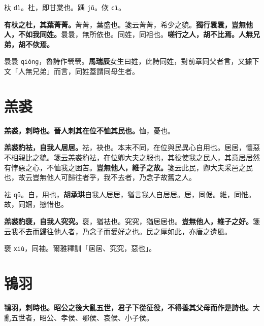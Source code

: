 \begin{quoting}杕 \texttt{dì}。杜，即甘棠也。踽 \texttt{jǔ}。佽 \texttt{cì}。\end{quoting}

\textbf{有杕之杜，其葉菁菁。}{\footnotesize 菁菁，葉盛也。箋云菁菁，希少之貌。}\textbf{獨行睘睘，豈無他人，不如我同姓。}{\footnotesize 睘睘，無所依也。同姓，同祖也。}\textbf{嗟行之人，胡不比焉。人無兄弟，胡不佽焉。}

\begin{quoting}睘睘 \texttt{qióng}，魯詩作煢煢。\textbf{馬瑞辰}女生曰姓，此詩同姓，對前章同父者言，又據下文「人無兄弟」而言，同姓蓋謂同母生者。\end{quoting}

\section{羔裘}


\textbf{羔裘，刺時也。晉人刺其在位不恤其民也。}{\footnotesize 恤，憂也。}

\textbf{羔裘豹袪，自我人居居。}{\footnotesize 袪，袂也。本末不同，在位與民異心自用也。居居，懷惡不相親比之貌。箋云羔裘豹袪，在位卿大夫之服也，其役使我之民人，其意居居然有悖惡之心，不恤我之困苦。}\textbf{豈無他人，維子之故。}{\footnotesize 箋云此民，卿大夫采邑之民也，故云豈無他人可歸往者乎，我不去者，乃念子故舊之人。}

\begin{quoting}袪 \texttt{qū}。自，用也，\textbf{胡承珙}自我人居居，猶言我人自居居。居，同倨。維，同惟。故，同婟，戀惜也。\end{quoting}

\textbf{羔裘豹褎，自我人究究。}{\footnotesize 褎，猶袪也。究究，猶居居也。}\textbf{豈無他人，維子之好。}{\footnotesize 箋云我不去而歸往他人者，乃念子而愛好之也。民之厚如此，亦唐之遺風。}

\begin{quoting}褎 \texttt{xiù}，同袖。爾雅釋訓「居居、究究，惡也」。\end{quoting}

\section{鴇羽}


\textbf{鴇羽，刺時也。昭公之後大亂五世，君子下從征役，不得養其父母而作是詩也。}{\footnotesize 大亂五世者，昭公、孝侯、鄂侯、哀侯、小子侯。}

